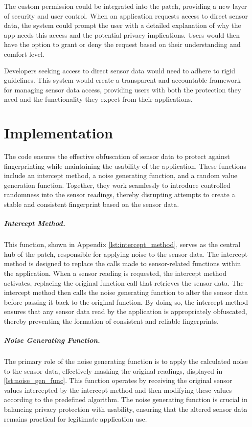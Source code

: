 \documentclass[11pt,
  oneside,openany,    %
]{scrreprt}
\begin{document}
The custom permission could be integrated into the patch, providing a new layer of security and user control. 
When an application requests access to direct sensor data, the system could prompt the user with a detailed explanation of why the app needs this access and the potential privacy implications. 
Users would then have the option to grant or deny the request based on their understanding and comfort level.

Developers seeking access to direct sensor data would need to adhere to rigid guidelines.
This system would create a transparent and accountable framework for managing sensor data access, providing users with both the protection they need and the functionality they expect from their applications.

\chapter{Implementation}
\label{chap:implementation}
The code ensures the effective obfuscation of sensor data to protect against fingerprinting while maintaining the usability of the application. 
These functions include an intercept method, a noise generating function, and a random value generation function. 
Together, they work seamlessly to introduce controlled randomness into the sensor readings, thereby disrupting attempts to create a stable and consistent fingerprint based on the sensor data.

\paragraph{Intercept Method.}
\label{par:intercept_method}
This function, shown in Appendix \ref{lst:intercept_method}, serves as the central hub of the patch, responsible for applying noise to the sensor data.
The intercept method is designed to replace the calls made to sensor-related functions within the application. 
When a sensor reading is requested, the intercept method activates, replacing the original function call that retrieves the sensor data.
The intercept method then calls the noise generating function to alter the sensor data before passing it back to the original function. 
By doing so, the intercept method ensures that any sensor data read by the application is appropriately obfuscated, thereby preventing the formation of consistent and reliable fingerprints.

\paragraph{Noise Generating Function.}
\label{par:noise_gen_func}
The primary role of the noise generating function is to apply the calculated noise to the sensor data, effectively masking the original readings, displayed in \ref{lst:noise_gen_func}.
This function operates by receiving the original sensor values intercepted by the intercept method and then modifying these values according to the predefined algorithm. 
The noise generating function is crucial in balancing privacy protection with usability, ensuring that the altered sensor data remains practical for legitimate application use.
\end{document}

